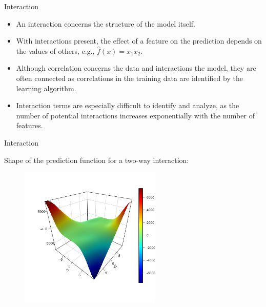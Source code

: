\documentclass[11pt,compress,t,notes=noshow, aspectratio=169, xcolor=table]{beamer}
\begin{document}
\begin{vbframe}{Interaction}
\begin{itemize}
\itemsep2em
\item An interaction concerns the structure of the model itself.
\item With interactions present, the effect of a feature on the prediction depends on the values of others, e.g., $\widehat{f}(x) = x_1 x_2$.
\item Although correlation concerns the data and interactions the model, they are often connected as correlations in the training data are identified by the learning algorithm.
\item Interaction terms are especially difficult to identify and analyze, as the number of potential interactions increases exponentially with the number of features.
\end{itemize}
\end{vbframe}

\begin{vbframe}{Interaction}

Shape of the prediction function for a two-way interaction:

\begin{figure}
\includegraphics[width = 0.6\textwidth]{figure/interaction}
\end{figure}
\end{vbframe}
\end{document}

